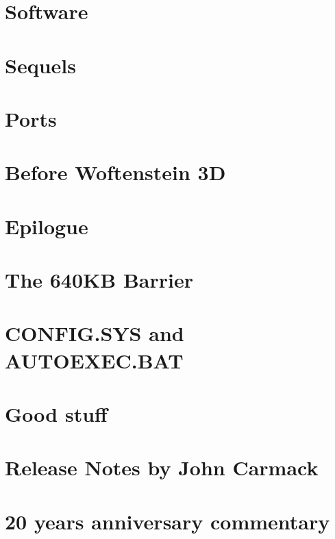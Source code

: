 \documentclass[8pt]{book}
\begin{document}
    \chapter{Software}
       
       
      
       
       
      
       
    \chapter{Sequels}
        
    \chapter{Ports}        
        
        
    \chapter{Before Woftenstein 3D}
        

     \chapter{Epilogue}
        
           
    \appendix
    \appendixpage

    \chapter{The 640KB Barrier}\label{chap:barrier640}
        
    \chapter{CONFIG.SYS and AUTOEXEC.BAT}
         
    \chapter{Good stuff}
          
    \chapter{Release Notes by John Carmack}
        
    \chapter{20 years anniversary commentary}
        

    
    \cleartoleftpage %
    
    \blankpage
    \blankpage
\end{document}
